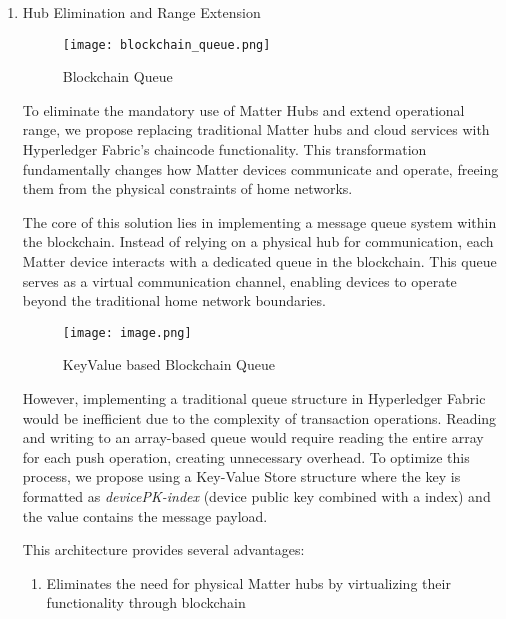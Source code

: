 \documentclass[conference]{IEEEtran}
\begin{document}
\begin{enumerate}[itemsep=2ex, parsep=1ex]
	\item Hub Elimination and Range Extension
	      
	      \begin{figure} [h!]
	      	\centering
	      	\texttt{[image: blockchain\_queue.png]}
	      	\caption{Blockchain Queue}
	      	\label{fig:blockchain_queue}
	      \end{figure}
	      	      
	      To eliminate the mandatory use of Matter Hubs and extend operational range,
	      we propose replacing traditional Matter hubs and cloud services with Hyperledger          Fabric's chaincode functionality. This transformation fundamentally changes how Matter
	      devices communicate and operate, freeing them from the physical constraints
	      of home networks.
	      	      
	      The core of this solution lies in implementing a message queue system within
	      the blockchain. Instead of relying on a physical hub for communication, each
	      Matter device interacts with a dedicated queue in the blockchain. This
	      queue serves as a virtual communication channel, enabling devices to operate
	      beyond the traditional home network boundaries.
	      	      
	      \begin{figure}[h!]
	      	\centering
	      	\texttt{[image: image.png]}
	      	\caption{Key\-Value based Blockchain Queue}
	      	\label{fig:KeyValueBasedBlockchainQueue}
	      \end{figure}
	      	      
	      However, implementing a traditional queue structure in Hyperledger Fabric
	      would be inefficient due to the complexity of transaction operations. Reading
	      and writing to an array-based queue would require reading the entire array
	      for each push operation, creating unnecessary overhead. To optimize this process,
	      we propose using a Key-Value Store structure where the key is formatted as
	      \emph{devicePK-index} (device public key combined with a index) and
	      the value contains the message payload.
	      	      
	      This architecture provides several advantages:
	      \begin{enumerate}[itemsep=2ex, parsep=1ex]
	      	\item Eliminates the need for physical Matter hubs by virtualizing their
	      	      functionality through blockchain
	      	      	      	      

\end{enumerate}
\end{enumerate}
\end{document}
